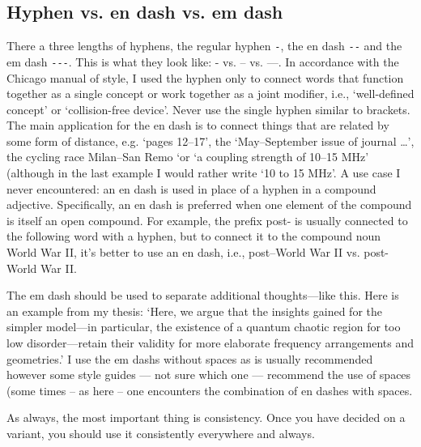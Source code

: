 \subsection{Hyphen vs. en dash vs. em dash}
There a three lengths of hyphens, the regular hyphen \verb|-|, the en dash \verb|--| and the em dash \verb|---|.
This is what they look like: - vs. -- vs. ---.
In accordance with the Chicago manual of style, I used the hyphen only to connect words that function together as a single concept or work together as a joint modifier, i.e., `well-defined concept' or `collision-free device'. Never use the single hyphen similar to brackets.
The main application for the en dash is to connect things that are related by some form of distance, e.g. `pages 12--17', the `May--September issue of journal \ldots', the cycling race Milan--San Remo `or `a coupling strength of 10--15 MHz' (although in the last example I would rather write `10 to 15 MHz'. 
A use case I never encountered: an en dash is used in place of a hyphen in a compound adjective. Specifically, an en dash is preferred when one element of the compound is itself an open compound. For example, the prefix post- is usually connected to the following word with a hyphen, but to connect it to the compound noun World War II, it’s better to use an en dash, i.e., post--World War II vs. post-World War II.

The em dash should be used to separate additional thoughts---like this. Here is an example from my thesis: `Here, we argue that the insights gained for the simpler model---in particular, the existence of a quantum chaotic region for too low disorder---retain their validity for more elaborate frequency arrangements and geometries.' I use the em dashs without spaces as is usually recommended however some style guides --- not sure which one --- recommend the use of spaces (some times -- as here -- one encounters the combination of en dashes with spaces.

As always, the most important thing is consistency. Once you have decided on a variant, you should use it consistently everywhere and always.

